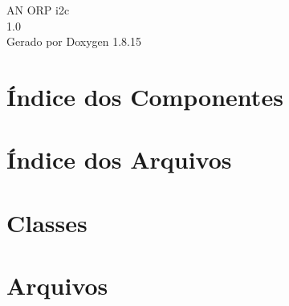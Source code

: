 \let\mypdfximage\pdfximage\def\pdfximage{\immediate\mypdfximage}\documentclass[twoside]{book}
\newcommand{\+}{\discretionary{\mbox{\scriptsize$\hookleftarrow$}}{}{}}
\newcommand{\clearemptydoublepage}{%
  \newpage{\pagestyle{empty}\cleardoublepage}%
}
\begin{document}
\hypersetup{pageanchor=false,
             bookmarksnumbered=true,
             pdfencoding=unicode
            }
\begin{titlepage}
\vspace*{7cm}
\begin{center}%
{\Large AN O\+RP i2c \\[1ex]\large 1.\+0 }\\
\vspace*{1cm}
{\large Gerado por Doxygen 1.8.15}\\
\end{center}
\end{titlepage}
\clearemptydoublepage
{}
\tableofcontents
\clearemptydoublepage
{}
\hypersetup{pageanchor=true}

\chapter{Índice dos Componentes}

\chapter{Índice dos Arquivos}

\chapter{Classes}

\chapter{Arquivos}




\backmatter
\newpage
{}
\clearemptydoublepage
{}
\printindex
\end{document}
